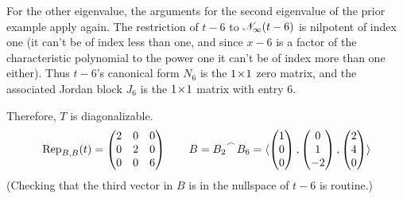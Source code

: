 \begin{example}
For the other eigenvalue, the arguments for the second eigenvalue of
the prior example apply again.
The restriction of $t-6$ to $\mathscr{N}_\infty(t-6)$ is nilpotent of 
index one (it can't be of index less than one, and since $x-6$ is a 
factor of the characteristic polynomial to the power one it can't
be of index more than one either). 
Thus $t-6$'s canonical form $N_6$ is the $1 \! \times \! 1$ zero matrix,
and the associated Jordan block $J_6$ is the $1 \! \times \! 1$ matrix with entry $6$.
 
Therefore, \( T \) is diagonalizable.
\begin{equation*}
  \rep{t}{B,B}=
  \begin{pmatrix}
    2  &0  &0  \\
    0  &2  &0  \\
    0  &0  &6
  \end{pmatrix}
  \qquad
  B=\cat{B_2}{B_6}
   =\sequence{\colvec{1 \\ 0 \\ 0},
              \colvec{0 \\ 1 \\ -2},
              \colvec{2 \\ 4 \\ 0}}
\end{equation*}
(Checking that the third vector in $B$ is in the nullspace of $t-6$ is
routine.)
\end{example}

